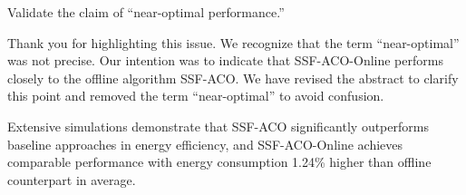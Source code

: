 \begin{metacomment}
	Validate the claim of ``near-optimal performance.''
\end{metacomment}
\begin{metaresponse}
	Thank you for highlighting this issue.
	We recognize that the term ``near-optimal'' was not precise. Our intention was to indicate that SSF-ACO-Online performs closely to the offline algorithm SSF-ACO. We have revised the abstract to clarify this point and removed the term ``near-optimal'' to avoid confusion.
	\begin{changes}
		Extensive simulations demonstrate that SSF-ACO significantly outperforms baseline approaches in energy efficiency, and SSF-ACO-Online achieves comparable performance with energy consumption 1.24\% higher than offline counterpart in average.
	\end{changes}
\end{metaresponse}

